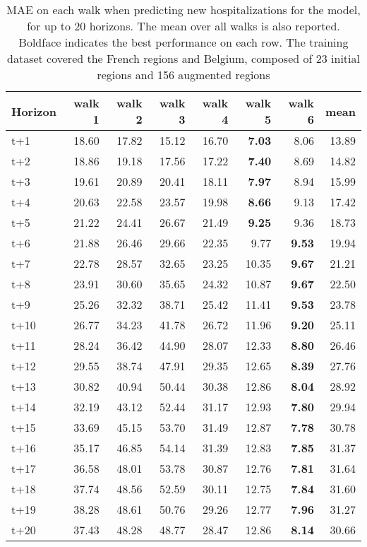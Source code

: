 \begin{table}[H]
\centering
\caption{MAE on each walk when predicting new hospitalizations for the model, for up to 20 horizons. The mean over all walks is also reported. Boldface indicates the best performance on each row. The training dataset covered the French regions and Belgium, composed of 23 initial regions and 156 augmented regions }
\label{tab:MAE_walk_encoder_decoder}
\begin{tabular}{lrrrrrrr}
\toprule
Horizon &  walk 1 &  walk 2 &  walk 3 &  walk 4 &  walk 5 &  walk 6 &  mean \\
\midrule
t+1  & 18.60  & 17.82  & 15.12  & 16.70  & \textbf{7.03}  & 8.06  & 13.89  \\
t+2  & 18.86  & 19.18  & 17.56  & 17.22  & \textbf{7.40}  & 8.69  & 14.82  \\
t+3  & 19.61  & 20.89  & 20.41  & 18.11  & \textbf{7.97}  & 8.94  & 15.99  \\
t+4  & 20.63  & 22.58  & 23.57  & 19.98  & \textbf{8.66}  & 9.13  & 17.42  \\
t+5  & 21.22  & 24.41  & 26.67  & 21.49  & \textbf{9.25}  & 9.36  & 18.73  \\
t+6  & 21.88  & 26.46  & 29.66  & 22.35  & 9.77  & \textbf{9.53}  & 19.94  \\
t+7  & 22.78  & 28.57  & 32.65  & 23.25  & 10.35  & \textbf{9.67}  & 21.21  \\
t+8  & 23.91  & 30.60  & 35.65  & 24.32  & 10.87  & \textbf{9.67}  & 22.50  \\
t+9  & 25.26  & 32.32  & 38.71  & 25.42  & 11.41  & \textbf{9.53}  & 23.78  \\
t+10  & 26.77  & 34.23  & 41.78  & 26.72  & 11.96  & \textbf{9.20}  & 25.11  \\
t+11  & 28.24  & 36.42  & 44.90  & 28.07  & 12.33  & \textbf{8.80}  & 26.46  \\
t+12  & 29.55  & 38.74  & 47.91  & 29.35  & 12.65  & \textbf{8.39}  & 27.76  \\
t+13  & 30.82  & 40.94  & 50.44  & 30.38  & 12.86  & \textbf{8.04}  & 28.92  \\
t+14  & 32.19  & 43.12  & 52.44  & 31.17  & 12.93  & \textbf{7.80}  & 29.94  \\
t+15  & 33.69  & 45.15  & 53.70  & 31.49  & 12.87  & \textbf{7.78}  & 30.78  \\
t+16  & 35.17  & 46.85  & 54.14  & 31.39  & 12.83  & \textbf{7.85}  & 31.37  \\
t+17  & 36.58  & 48.01  & 53.78  & 30.87  & 12.76  & \textbf{7.81}  & 31.64  \\
t+18  & 37.74  & 48.56  & 52.59  & 30.11  & 12.75  & \textbf{7.84}  & 31.60  \\
t+19  & 38.28  & 48.61  & 50.76  & 29.26  & 12.77  & \textbf{7.96}  & 31.27  \\
t+20  & 37.43  & 48.28  & 48.77  & 28.47  & 12.86  & \textbf{8.14}  & 30.66  \\

\bottomrule
\end{tabular}
\end{table}
